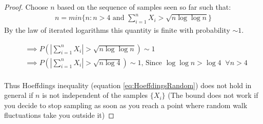\documentclass{article}
\newcommand{\eq}[1]{\begin{align*}#1\end{align*}}
\theoremstyle{plain}
\theoremstyle{definition}
\begin{document}
\begin{proof}
Choose $n$ based on the sequence of samples seen so far such that:
\eq {
n = min \{ n: n > 4 \text{ and } \sum_{i=1}^{n}X_i > \sqrt{n \log \log n}\}
}
By the law of iterated logarithms this quantity is finite with probability $\sim 1$.

\eq {
& \implies  P\left( |\sum_{i=1}^{n}X_i| > \sqrt{n \log{\log{n}}}\right) \sim 1 \\
& \implies  P\left( |\sum_{i=1}^{n}X_i| > \sqrt{n \log{4}}\right) \sim 1 \text{, Since } \log{\log{n}} > \log{4} \;\; \forall n > 4 \\
}
 
Thus Hoeffdings inequality (equation \ref{eq:HoeffdingsRandom}) does not hold in general if $n$ is not independent of the samples $\{X_i\}$ (The bound does not work if you decide to stop sampling as soon as you reach a point where random walk fluctuations take you outside it)



\end{proof}




\end{document}
